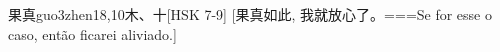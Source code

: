 \begin{EntryWithPhonetic}{果真}{guo3zhen1}{8,10}{⽊、⼗}[HSK 7-9]
  [果真如此, 我就放心了。===Se for esse o caso, então ficarei aliviado.]
\end{EntryWithPhonetic}
